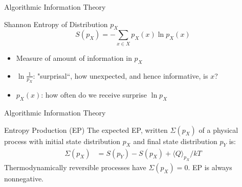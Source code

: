 \begin{frame}{Algorithmic Information Theory}
    \begin{block}{Shannon Entropy of Distribution $p_X$}
    \begin{equation*}
    S(p_X) = - \sum_{x\in X} p_X(x)\ln p_X(x)    
    \end{equation*}
    \begin{itemize}
        \item Measure of amount of information in $p_X$
        \item $\ln \frac{1}{p_X}$: "surprisal``, how unexpected, and hence informative, is $x$?
        \item $p_X(x)$: how often do we receive surprise $\ln p_X$
    \end{itemize}
    \end{block}
\end{frame}

\begin{frame}{Algorithmic Information Theory}
    \begin{block}{Entropy Production (EP)}
    The expected EP, written $\Sigma (p_X)$ of a physical process with initial state distribution $p_X$ and final state distribution $p_Y$ is:
    \begin{align*}
        \Sigma (p_X) &= S(p_Y) - S(p_X) + \langle Q \rangle_{p_X}/kT
    \end{align*}
    Thermodynamically reversible processes have $\Sigma (p_X)=0$. EP is always nonnegative.
    \end{block}
\end{frame}